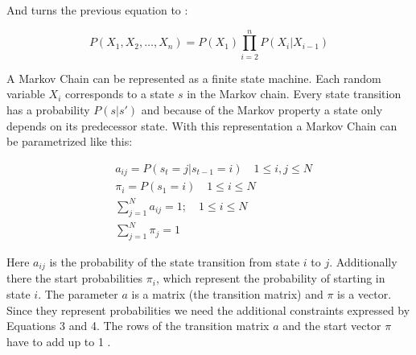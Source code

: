 And turns the previous equation to :

\begin{equation}
P\left(X_{1}, X_{2}, \ldots, X_{n}\right)=P\left(X_{1}\right) \prod_{i=2}^{n} P\left(X_{i} | X_{i-1}\right)
\end{equation}

A Markov Chain can be represented as a finite state machine. Each random variable $X_i$ corresponds to a state $s$ in the Markov chain. Every state transition has a probability $P(s | s')$ and because of the Markov property a state only depends on its predecessor state. With this representation a Markov Chain can be parametrized like this:

\begin{equation}
\begin{aligned}
&a_{i j}=P\left(s_{t}=j | s_{t-1}=i\right) \quad 1 \leq i, j \leq N \\
&\pi_{i}=P\left(s_{1}=i\right) \quad 1 \leq i \leq N \\
&\sum_{j=1}^{N} a_{i j}=1 ; \quad 1 \leq i \leq N \\
&\sum_{j=1}^{N} \pi_{j}=1
\end{aligned}
\end{equation}

Here $a_{ij}$ is the probability of the state transition from state $i$ to $j$. Additionally there the start probabilities $\pi_i$, which represent the probability of starting in state $i$. The parameter $a$ is a matrix (the transition matrix) and $\pi$ is a vector. Since they represent probabilities we need the additional constraints expressed by Equations 3 and 4. The rows of the transition matrix $a$ and the start vector $\pi$ have to add up to 1 \parencite{huang2001spoken}.

